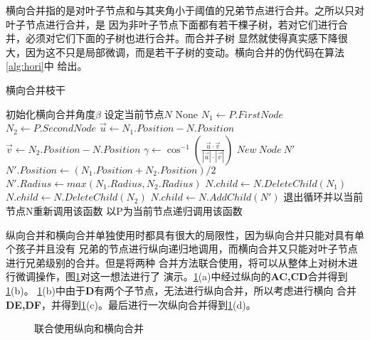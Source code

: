 横向合并指的是对叶子节点和与其夹角小于阈值的兄弟节点进行合并。之所以只对叶子节点进行合并，是
因为非叶子节点下面都有若干棵子树，若对它们进行合并，必须对它们下面的子树也进行合并。而合并子树
显然就使得真实感下降很大，因为这不只是局部微调，而是若干子树的变动。横向合并的伪代码在算法\ref{alg:hori}中
给出。

\begin{algorithm}[H]
	\caption{横向合并枝干}
	\label{alg:hori}
	\begin{algorithmic}[1] 
	\Require 初始化横向合并角度$\beta$
	\Require 设定当前节点$N$
	\Ensure None
		\State $N_1 \gets P.FirstNode$
		\State $N_2 \gets P.SecondNode$
			\State $\vec{u} \gets N_1.Position - N.Position$
			\State $\vec{v} \gets N_2.Position - N.Position$
			\State $\gamma \gets \cos^{-1}({\frac{\vec{u} \cdot \vec{v}}{|\vec{u}|\cdot|\vec{v}|}})$
			\If{$\gamma<\beta$}
				\State $New\ Node\ N'$
				\State $N'.Position \gets (N_1.Position+N_2.Position)/2$
				\State $N'.Radius \gets max(N_1.Radius,N_2.Radius)$
				\State $N.child \gets N.DeleteChild(N_1)$
				\State $N.child \gets N.DeleteChild(N_2)$
				\State $N.child \gets N.AddChild(N')$
				\State 退出循环并以当前节点N重新调用该函数
			\EndIf
		\EndIf
	\EndFor
		\State 以P为当前节点递归调用该函数
	\EndFor
\end{algorithmic}
\end{algorithm}

纵向合并和横向合并单独使用时都具有很大的局限性，因为纵向合并只能对具有单个孩子并且没有
兄弟的节点进行纵向递归地调用，而横向合并又只能对叶子节点进行兄弟级别的合并。但是将两种
合并方法联合使用，将可以从整体上对树木进行微调操作，图\ref{fig:combine}对这一想法进行了
演示。\ref{fig:combine}(a)中经过纵向的\textbf{AC,CD}合并得到\ref{fig:combine}(b)。
\ref{fig:combine}(b)中由于\textbf{D}有两个子节点，无法进行纵向合并，所以考虑进行横向
合并\textbf{DE,DF}，并得到\ref{fig:combine}(c)。最后进行一次纵向合并得到\ref{fig:combine}(d)。

\begin{figure}[H]
	\centering
	\hspace{4em}
	\hspace{4em}
	\hspace{4em}
	\caption{联合使用纵向和横向合并}
	\label{fig:combine}
\end{figure}

